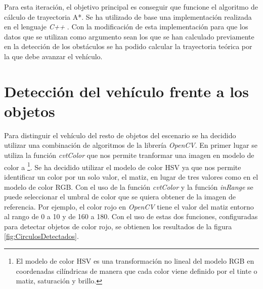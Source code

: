 Para esta iteración, el objetivo principal es conseguir que funcione el algoritmo de cálculo de trayectoria A*. Se ha utilizado de base una implementación realizada en el lenguaje \emph{C++} \cite{ImplementacionAlgoritmoA}. Con la modificación de esta implementación para que los datos que se utilizan como argumento sean los que se han calculado previamente en la detección de los obstáculos se ha podido calcular la trayectoria teórica por la que debe avanzar el vehículo.

\section{Detección del vehículo frente a los objetos}\label{sec:DeteccionVehiculo}

Para distinguir el vehículo del resto de objetos del escenario se ha decidido utilizar una combinación de algoritmos de la librería \emph{OpenCV}. En primer lugar se utiliza la función \emph{cvtColor} que nos permite tranformar una imagen en modelo de color  a \footnote{El modelo de color \ac{HSV} es una transformación no lineal del modelo \ac{RGB} en coordenadas cilíndricas de manera que cada color viene definido por el tinte o matiz, saturación y brillo.}. Se ha decidido utilizar el modelo de color \ac{HSV} ya que nos permite identificar un color por un solo valor, el matiz, en lugar de tres valores como en el modelo de color \ac{RGB}. Con el uso de la función \emph{cvtColor} y la función \emph{inRange} se puede seleccionar el umbral de color que se quiera obtener de la imagen de referencia. Por ejemplo, el color rojo en \emph{OpenCV} tiene el valor del matiz entorno al rango de 0 a 10 y de 160 a 180. Con el uso de estas dos funciones, configuradas para detectar objetos de color rojo, se obtienen los resultados de la figura \ref{fig:CirculosDetectados}.

